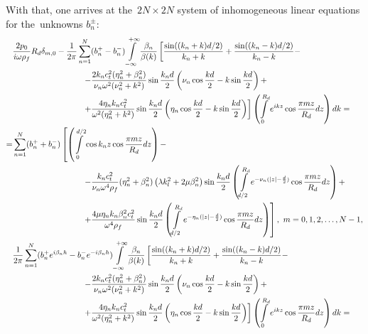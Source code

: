 With that, one arrives at the~$2N\times 2N$ system of inhomogeneous linear equations for the~unknowns $b_n^{\pm}$:
\begin{align}
&\frac{2p_0}{i\omega\rho_f}R_d\delta_{m,0}
-\frac{1}{2 \pi} \sum\limits_{n=1}^{N}({b_n^+}-{b_n^-})\int\limits_{-\infty}^{+\infty}\frac{\beta_n}{\beta(k)}\left[\frac{\sin((k_n+k)d/2)}{k_n+k}+\frac{\sin((k_n-k)d/2)}{k_n-k}-\right. \label{eq:25Rayleigh}\\
%
&\hspace{3cm}\left.-\frac{2k_n c_t^2(\eta_n^2+\beta_n^2)}{\nu_n\omega^2(\nu_n^2+k^2)}\sin\frac{k_nd}{2} \left(\nu_n \cos\frac{kd}{2}-k\sin\frac{kd}{2}\right) + \right. \notag \\
&\hspace{3cm}\left.+ \frac{4\eta_n k_nc_t^2}{\omega^2(\eta_n^2+k^2)}\sin\frac{k_nd}{2} \left(\eta_n \cos\frac{kd}{2}-k\sin\frac{kd}{2}\right)\right] \left(\int\limits_{0}^{R_d}e^{ikz}\cos{\frac{\pi mz}{R_d}}dz\right)dk = \notag\\
=
&\sum\limits_{n=1}^{N}({b_n^+}+{b_n^-})\left[\left(\int\limits_0^{d/2}\cos{k_nz}\cos{\frac{\pi mz}{R_d}}dz\right)
-\right. \notag\\
%
&\hspace{3cm} \left.-\frac{k_n c_t^2}{\nu_n\omega^4\rho_f}(\eta_n^2+\beta_n^2)\left(\lambda k_l^2+2\mu\beta_n^2\right)\sin\frac{k_nd}{2}\left(\int\limits_{d/2}^{R_d}e^{-\nu_n (|z|-\frac{d}{2})}\cos{\frac{\pi mz}{R_d}}dz\right)+\right. \notag\\
&\hspace{3cm} \left.+\frac{4\mu \eta_n k_n\beta_n^2 c_t^2}{\omega^4\rho_f}\sin\frac{k_nd}{2} \left(\int\limits_{d/2}^{R_d}e^{-\eta_n (|z|-\frac{d}{2})}\cos{\frac{\pi mz}{R_d}}dz\right)\right],~m=0,1,2,\dots,N-1, \notag\\
&\frac{1}{2 \pi} \sum\limits_{n=1}^{N}({b_n^+}e^{i\beta_nh}-{b_n^-}e^{-i\beta_nh})\int\limits_{-\infty}^{+\infty}\frac{\beta_n}{\beta(k)}\left[\frac{\sin((k_n+k)d/2)}{k_n+k}+\frac{\sin((k_n-k)d/2)}{k_n-k}-
\right. \label{eq:26Rayleigh}\\
%
&\hspace{3cm}\left.-\frac{2k_n c_t^2(\eta_n^2+\beta_n^2)}{\nu_n\omega^2(\nu_n^2+k^2)}\sin\frac{k_nd}{2} \left(\nu_n \cos\frac{kd}{2}-k\sin\frac{kd}{2}\right) + \right. \notag \\
&\hspace{3cm}\left.+ \frac{4\eta_n k_nc_t^2}{\omega^2(\eta_n^2+k^2)}\sin\frac{k_nd}{2} \left(\eta_n \cos\frac{kd}{2}-k\sin\frac{kd}{2}\right)\right] \left(\int\limits_{0}^{R_d}e^{ikz}\cos{\frac{\pi mz}{R_d}}dz\right)dk = \notag\\

\end{align}
